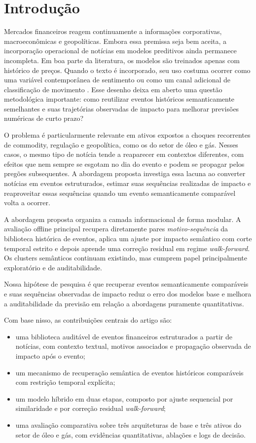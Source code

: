 \documentclass[conference]{IEEEtran}
\begin{document}
\section{Introdução}

Mercados financeiros reagem continuamente a informações corporativas, macroeconômicas e geopolíticas. Embora essa premissa seja bem aceita, a incorporação operacional de notícias em modelos preditivos ainda permanece incompleta. Em boa parte da literatura, os modelos são treinados apenas com histórico de preços. Quando o texto é incorporado, seu uso costuma ocorrer como uma variável contemporânea de sentimento ou como um canal adicional de classificação de movimento \cite{Tetlock:2007, Tetlock:2008, Xu:2018, Sawhney:2020}. Esse desenho deixa em aberto uma questão metodológica importante: como reutilizar eventos históricos semanticamente semelhantes e suas trajetórias observadas de impacto para melhorar previsões numéricas de curto prazo?

O problema é particularmente relevante em ativos expostos a choques recorrentes de commodity, regulação e geopolítica, como os do setor de óleo e gás. Nesses casos, o mesmo tipo de notícia tende a reaparecer em contextos diferentes, com efeitos que nem sempre se esgotam no dia do evento e podem se propagar pelos pregões subsequentes. A abordagem proposta investiga essa lacuna ao converter notícias em eventos estruturados, estimar suas sequências realizadas de impacto e reaproveitar essas sequências quando um evento semanticamente comparável volta a ocorrer.

A abordagem proposta organiza a camada informacional de forma modular. A avaliação offline principal recupera diretamente pares \textit{motivo-sequência} da biblioteca histórica de eventos, aplica um ajuste por impacto semântico com corte temporal estrito e depois aprende uma correção residual em regime \textit{walk-forward}. Os clusters semânticos continuam existindo, mas cumprem papel principalmente exploratório e de auditabilidade.

Nossa hipótese de pesquisa é que recuperar eventos semanticamente comparáveis e suas sequências observadas de impacto reduz o erro dos modelos base e melhora a auditabilidade da previsão em relação a abordagens puramente quantitativas.

Com base nisso, as contribuições centrais do artigo são:

\begin{itemize}
    \item uma biblioteca auditável de eventos financeiros estruturados a partir de notícias, com contexto textual, motivos associados e propagação observada de impacto após o evento;
    \item um mecanismo de recuperação semântica de eventos históricos comparáveis com restrição temporal explícita;
    \item um modelo híbrido em duas etapas, composto por ajuste sequencial por similaridade e por correção residual \textit{walk-forward};
    \item uma avaliação comparativa sobre três arquiteturas de base e três ativos do setor de óleo e gás, com evidências quantitativas, ablações e logs de decisão.
\end{itemize}
\end{document}
